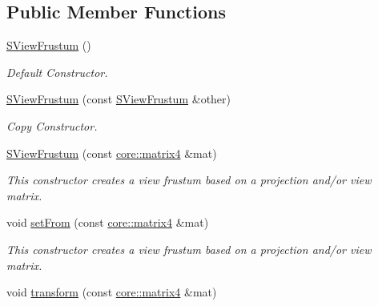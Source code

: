 \subsection*{Public Member Functions}
\begin{DoxyCompactItemize}
\item 
\mbox{\label{structirr_1_1scene_1_1SViewFrustum_a7052e88c612bd1239115929e94e6210d}} 
\hyperlink{structirr_1_1scene_1_1SViewFrustum_a7052e88c612bd1239115929e94e6210d}{S\+View\+Frustum} ()
\begin{DoxyCompactList}\small\item\em Default Constructor. \end{DoxyCompactList}\item 
\hyperlink{structirr_1_1scene_1_1SViewFrustum_aa7cfed3ee9feee79efe02d26f3b14b0c}{S\+View\+Frustum} (const \hyperlink{structirr_1_1scene_1_1SViewFrustum}{S\+View\+Frustum} \&other)
\begin{DoxyCompactList}\small\item\em Copy Constructor. \end{DoxyCompactList}\item 
\mbox{\label{structirr_1_1scene_1_1SViewFrustum_acfcbb01f1e26f73ee1d9c7695302a508}} 
\hyperlink{structirr_1_1scene_1_1SViewFrustum_acfcbb01f1e26f73ee1d9c7695302a508}{S\+View\+Frustum} (const \hyperlink{namespaceirr_1_1core_a4c9d4e29899535971052810954a14431}{core\+::matrix4} \&mat)
\begin{DoxyCompactList}\small\item\em This constructor creates a view frustum based on a projection and/or view matrix. \end{DoxyCompactList}\item 
\mbox{\label{structirr_1_1scene_1_1SViewFrustum_a2517bde9292aa26119d75b9ff0b92833}} 
void \hyperlink{structirr_1_1scene_1_1SViewFrustum_a2517bde9292aa26119d75b9ff0b92833}{set\+From} (const \hyperlink{namespaceirr_1_1core_a4c9d4e29899535971052810954a14431}{core\+::matrix4} \&mat)
\begin{DoxyCompactList}\small\item\em This constructor creates a view frustum based on a projection and/or view matrix. \end{DoxyCompactList}\item 
void \hyperlink{structirr_1_1scene_1_1SViewFrustum_aeabadaf532f08ba3cb98b897ff0619f2}{transform} (const \hyperlink{namespaceirr_1_1core_a4c9d4e29899535971052810954a14431}{core\+::matrix4} \&mat)

\end{DoxyCompactItemize}

